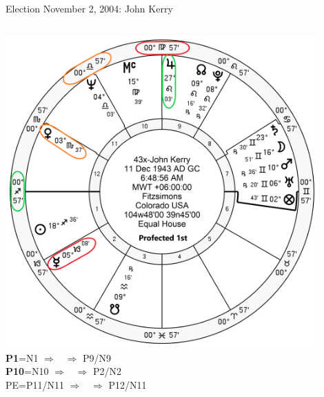 \begin{frame}[t]{Election November 2, 2004: John Kerry}
\begin{columns}[T, onlytextwidth]
\vspace{-1em}
{\includegraphics[width=0.9\textwidth]{charts/Kerry-Prof-1st.png}}
\fontsize{8pt}{9pt}\selectfont
\textbf{\dgreen P1}=N1
	$\Rightarrow$ \Jupiter\, $\Rightarrow$ P9/N9\\
\textbf{\red P10}=N10
	$\Rightarrow$ \Mercury\, $\Rightarrow$ P2/N2\\
PE=P11/N11
	 $\Rightarrow$ \Venus\, $\Rightarrow$ P12/N11

\end{columns}
\end{frame}
